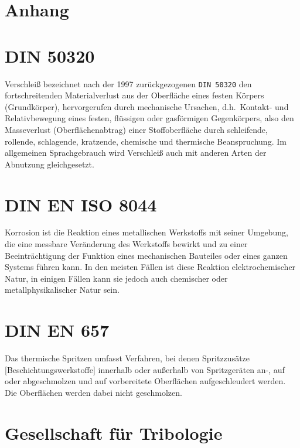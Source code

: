 \documentclass[12pt,a4paper,bibliography=totocnumbered,listof=totocnumbered,fleqn]{scrartcl}
\begin{document}
\newpage

\begin{appendix}
\section*{Anhang}
{}

\section{DIN 50320}
\label{app:din50320}
Verschleiß bezeichnet nach der 1997 zurückgezogenen \texttt{DIN 50320} den fortschreitenden Materialverlust aus der Oberfläche eines festen Körpers (Grundkörper), hervorgerufen durch mechanische Ursachen, d.h.\ Kontakt- und Relativbewegung eines festen, flüssigen oder gasförmigen Gegenkörpers, also den Masseverlust (Oberflächenabtrag) einer Stoffoberfläche durch schleifende, rollende, schlagende, kratzende, chemische und thermische Beanspruchung. Im allgemeinen Sprachgebrauch wird Verschleiß auch mit anderen Arten der Abnutzung gleichgesetzt.

\section{DIN EN ISO 8044}
\label{app:korro}
Korrosion ist die Reaktion eines metallischen Werkstoffs mit seiner Umgebung, die eine messbare Veränderung des Werkstoffs bewirkt und zu einer Beeinträchtigung der Funktion eines mechanischen Bauteiles oder eines ganzen Systems führen kann. 
In den meisten Fällen ist diese Reaktion elektrochemischer Natur, in einigen Fällen kann sie jedoch auch chemischer oder metallphysikalischer Natur sein.

\section{DIN EN 657}
\label{app:dinen657}
Das thermische Spritzen umfasst Verfahren, bei denen Spritzzusätze [Beschichtungswerkstoffe] innerhalb oder außerhalb von Spritzgeräten an-, auf oder abgeschmolzen und auf vorbereitete Oberflächen aufgeschleudert werden. Die Oberflächen werden dabei nicht geschmolzen.

\pagebreak

\section{Gesellschaft für Tribologie}
\label{app:gft}
\begin{figure}[h]
\centering

\end{figure}
\pagebreak

\end{appendix}
\end{document}
